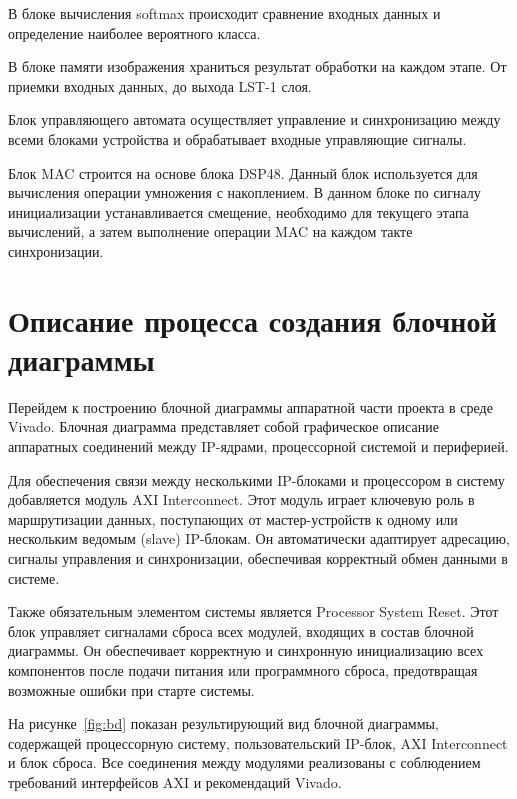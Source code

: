 В блоке вычисления softmax происходит сравнение входных данных и определение 
наиболее вероятного класса.

В блоке памяти изображения храниться результат обработки на каждом этапе. От 
приемки входных данных, до выхода LST-1 слоя.

Блок управляющего автомата осуществляет управление и синхронизацию между всеми 
блоками устройства и обрабатывает входные управляющие сигналы.

Блок MAC строится на основе блока DSP48. Данный блок используется для 
вычисления операции умножения с накоплением. В данном блоке по сигналу 
инициализации устанавливается смещение, необходимо для текущего этапа 
вычислений, а затем выполнение операции MAC на каждом такте синхронизации.

\section{Описание процесса создания блочной диаграммы}
\hspace*{12.5 mm}Перейдем к построению блочной диаграммы аппаратной части 
проекта в среде Vivado. Блочная диаграмма представляет собой графическое 
описание аппаратных соединений между IP-ядрами, процессорной системой и 
периферией.

Для обеспечения связи между несколькими IP-блоками и процессором в систему 
добавляется модуль AXI Interconnect. Этот модуль играет ключевую роль в 
маршрутизации данных, поступающих от мастер-устройств к одному или нескольким 
ведомым (slave) IP-блокам. Он автоматически адаптирует адресацию, сигналы 
управления и синхронизации, обеспечивая корректный обмен данными в системе.

Также обязательным элементом системы является Processor System Reset. Этот блок 
управляет сигналами сброса всех модулей, входящих в состав блочной диаграммы. 
Он обеспечивает корректную и синхронную инициализацию всех компонентов после 
подачи питания или программного сброса, предотвращая возможные ошибки при 
старте системы.

На рисунке~\ref{fig:bd} показан результирующий вид блочной диаграммы, 
содержащей процессорную систему, пользовательский IP-блок, AXI Interconnect и 
блок сброса. Все соединения между модулями реализованы с соблюдением требований 
интерфейсов AXI и рекомендаций Vivado.

